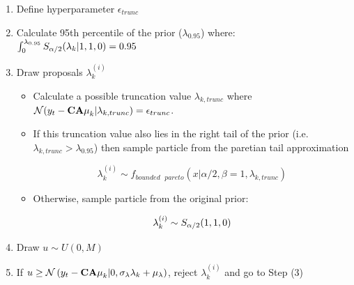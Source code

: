 \documentclass[../main.tex]{subfiles}
\begin{document}
\begin{enumerate}
	
	\item Define hyperparameter $\epsilon_{trunc}$
	\item Calculate 95th percentile of the prior ($\lambda_{0.95}$) where: $\int_{0}^{\lambda_{0.95}}S_{\alpha/2}(\lambda_k | 1,1,0) = 0.95$
	
	\item Draw proposals $\lambda_k^{(i)}$
	\begin{itemize}
		\item Calculate a possible truncation value $\lambda_{k, trunc}$ where $\mathcal{N}(y_t - {\bf CA\mu}_k | \lambda_{k, trunc}) = \epsilon_{trunc}$.
		\item If this truncation value also lies in the right tail of the prior (i.e. $\lambda_{k, trunc} > \lambda_{0.95}$) then sample particle from the paretian tail approximation
		
		$$ \lambda_k^{(i)} \sim f_{bounded \text{ }pareto}(x | \alpha/2, \beta = 1, \lambda_{k, trunc}) $$
		
		\item Otherwise, sample particle from the original prior:
		
		$$ \lambda_k^{(i)} \sim S_{\alpha/2}(1,1,0) $$
	\end{itemize}
	
	\item Draw $ u \sim U ( 0, M )$
	\item If $u \geq \mathcal{N}\left( y_t - {\bf CA\mu}_k | 0, \sigma_\lambda \lambda_k + \mu_\lambda \right)$, reject $\lambda_k^{(i)}$ and go to Step (3)
\end{enumerate}



%
%
%
%
%
%
\end{document}

